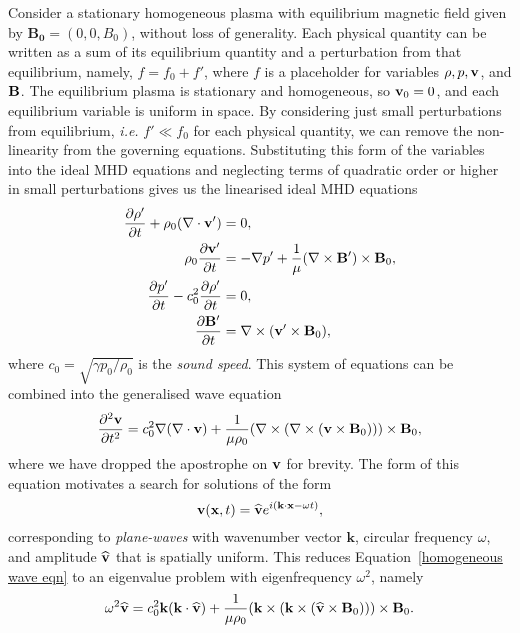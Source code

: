 Consider a stationary homogeneous plasma with equilibrium magnetic field given by $\mathbf{B_0} = (0, 0, B_0)$, without loss of generality. Each physical quantity can be written as a sum of its equilibrium quantity and a perturbation from that equilibrium, namely, $f = f_0 + f'$, where $f$ is a placeholder for variables $\rho, p, \mathbf{v}$, and $\mathbf{B}$. The equilibrium plasma is stationary and homogeneous, so $\mathbf{v}_0 = 0$, and each equilibrium variable is uniform in space. By considering just small perturbations from equilibrium, \textit{i.e.} $f' \ll f_0$ for each physical quantity, we can remove the non-linearity from the governing equations. Substituting this form of the variables into the ideal MHD equations and neglecting terms of quadratic order or higher in small perturbations gives us the linearised ideal MHD equations
\begin{align}
	\frac{\partial\rho'}{\partial t} + \rho_0(\nabla\cdot\mathbf{v}') &= 0, \label{cont eqn lin} \\
	\rho_0\frac{\partial\mathbf{v}'}{\partial t} &= -\nabla p' + \frac{1}{\mu}(\nabla\times\mathbf{B}')\times\mathbf{B}_0, \label{mom eqn lin} \\
	\frac{\partial p'}{\partial t} - c_0^2\frac{\partial\rho'}{\partial t} &= 0, \label{energy eqn lin} \\
	\frac{\partial\mathbf{B}'}{\partial t} &= \nabla\times(\mathbf{v}'\times\mathbf{B}_0), \label{ind eqn lin}
\end{align}
where $c_0 = \sqrt{\gamma p_0/\rho_0}$ is the \textit{sound speed}. This system of equations can be combined into the generalised wave equation
\begin{equation}
	\frac{\partial^2\mathbf{v}}{\partial t^2} = c_0^2\nabla(\nabla\cdot\mathbf{v}) + \frac{1}{\mu\rho_0}(\nabla\times(\nabla\times(\mathbf{v}\times\mathbf{B}_0)))\times\mathbf{B}_0, \label{homogeneous wave eqn}
\end{equation}
where we have dropped the apostrophe on $\mathbf{v}$ for brevity. The form of this equation motivates a search for solutions of the form
\begin{equation}
	\mathbf{v}(\mathbf{x}, t) = \widehat{\mathbf{v}}e^{i(\mathbf{k}\cdot\mathbf{x} - \omega t)},
\end{equation}
corresponding to \textit{plane-waves} with wavenumber vector $\mathbf{k}$, circular frequency $\omega$, and amplitude $\widehat{\mathbf{v}}$ that is spatially uniform. This reduces Equation~\eqref{homogeneous wave eqn} to an eigenvalue problem with eigenfrequency $\omega^2$, namely
\begin{equation}
	\omega^2\widehat{\mathbf{v}} = c_0^2\mathbf{k}(\mathbf{k}\cdot\widehat{\mathbf{v}}) + \frac{1}{\mu\rho_0}(\mathbf{k}\times(\mathbf{k}\times(\widehat{\mathbf{v}}\times\mathbf{B}_0)))\times\mathbf{B}_0. \label{homogeneous wave eqn 2}
\end{equation}

